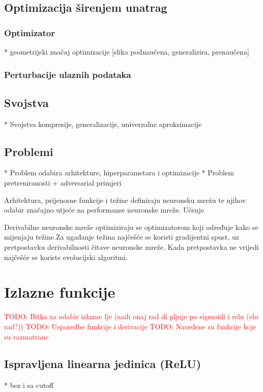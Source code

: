 \documentclass[times, utf8, diplomski]{fer}
\def\TODO#1{\noindent\textcolor{red}{TODO: #1}\newline}
\begin{document}
\subsection{Optimizacija širenjem unatrag}
\label{sec:backprop}

\subsubsection{Optimizator}
* geometrijski značaj optimizacije
[slika podnaučena, generalizira, prenaučena]

\subsubsection{Perturbacije ulaznih podataka}

\subsection{Svojstva}
* Svojstva kompresije, generalizacije, univerzalne aproksimacije


\subsection{Problemi}
* Problem odabira arhitekture, hiperparametara i optimizacije
* Problem pretreniranosti + adversarial primjeri

Arhitektura, prijenosne funkcije i težine definiraju neuronsku mrežu te njihov odabir značajno utjeće na performanse neuronske mreže. Učenje 

Derivabilne neuronske mreže optimiziraju se optimizatorom koji određuje kako se mijenjaju težine.Za ugađanje težina najčešće se koristi gradijentni spust, uz pretpostavku derivabilnosti čitave neuronske mreže. Kada pretpostavka ne vrijedi najčešće se koriste evolucijski algoritmi.

\section{Izlazne funkcije}
\label{sec:izlazne_fje}
\TODO{Bitka za odabir izlazne fje (nađi onaj rad di pljuje po sigmoidi i relu (elu rad?))}
\TODO{Usporedbe funkcije i derivacije}
\TODO{Navedene su funkcije koje su razmatrane}

\subsection*{Ispravljena linearna jedinica (ReLU)}
* bez i sa cutoff
\end{document}
